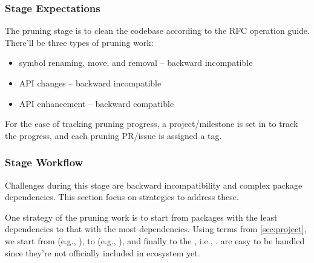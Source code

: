 \subsubsection*{Stage Expectations}

The pruning stage is to clean the codebase according to the RFC operation guide. There'll be three types of pruning work:
\begin{itemize}
    \item symbol renaming, move, and removal -- backward incompatible
    \item API changes -- backward incompatible
    \item API enhancement -- backward compatible
\end{itemize}
For the ease of tracking pruning progress, a project/milestone is set in \repoimages{} to track the progress, and each pruning PR/issue is assigned a tag. \par

\subsubsection*{Stage Workflow}

Challenges during this stage are backward incompatibility and complex package dependencies. This section focus on strategies to address these. \par

One strategy of the pruning work is to start from packages with the least dependencies to that with the most dependencies. Using terms from \cref{sec:project}, we start from  (e.g., \repoimagecore{}), to  (e.g., \repoimagetransformations{}), and finally to the , i.e., \repoimages{}.  are easy to be handled since they're not officially included in \images{} ecosystem yet. \par

